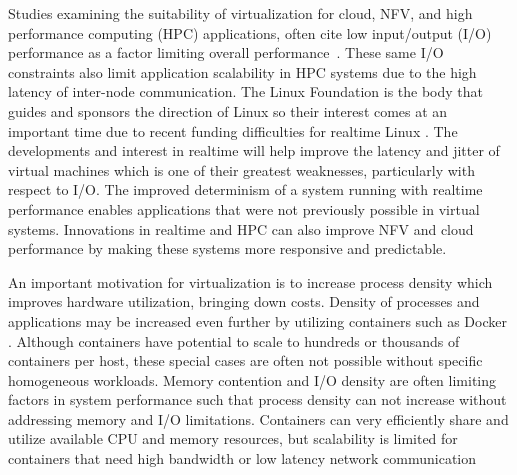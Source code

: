 Studies examining the suitability of virtualization for cloud, NFV, and high performance computing (HPC) applications, often cite low input/output (I/O) performance as a factor limiting overall performance~\autocite{xavier2013performance, _younge_1, des2005virtualization}.
These same I/O constraints also limit application scalability in HPC systems due to the high latency of inter-node communication.
The Linux Foundation is the body that guides and sponsors the direction of Linux so their interest comes at an important time due to recent funding difficulties for realtime Linux \autocite{_lwn_1}.
The developments and interest in realtime will help improve the latency and jitter of virtual machines which is one of their greatest weaknesses, particularly with respect to I/O.
The improved determinism of a system running with realtime performance enables applications that were not previously possible in virtual systems.
Innovations in realtime and HPC can also improve NFV and cloud performance by making these systems more responsive and predictable.

An important motivation for virtualization is to increase process density which improves hardware utilization, bringing down costs.
Density of processes and applications may be increased even further by utilizing containers such as Docker \autocite{dockerdotcom}.
Although containers have potential to scale to hundreds or thousands of containers per host, these special cases are often not possible without specific homogeneous workloads.
Memory contention and I/O density are often limiting factors in system performance such that process density can not increase without addressing memory and I/O limitations.
Containers can very efficiently share and utilize available CPU and memory resources, but scalability is limited for containers that need high bandwidth or low latency network communication

